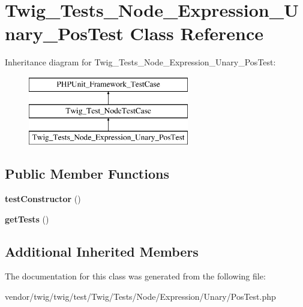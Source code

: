 \hypertarget{classTwig__Tests__Node__Expression__Unary__PosTest}{}\section{Twig\+\_\+\+Tests\+\_\+\+Node\+\_\+\+Expression\+\_\+\+Unary\+\_\+\+Pos\+Test Class Reference}
\label{classTwig__Tests__Node__Expression__Unary__PosTest}
Inheritance diagram for Twig\+\_\+\+Tests\+\_\+\+Node\+\_\+\+Expression\+\_\+\+Unary\+\_\+\+Pos\+Test\+:\begin{figure}[H]
\begin{center}
\leavevmode
\includegraphics[height=3.000000cm]{classTwig__Tests__Node__Expression__Unary__PosTest}
\end{center}
\end{figure}
\subsection*{Public Member Functions}
\begin{DoxyCompactItemize}
\item 
{\bfseries test\+Constructor} ()\hypertarget{classTwig__Tests__Node__Expression__Unary__PosTest_aefce6db0d4433975e4c096f1cfa0f5c2}{}\label{classTwig__Tests__Node__Expression__Unary__PosTest_aefce6db0d4433975e4c096f1cfa0f5c2}

\item 
{\bfseries get\+Tests} ()\hypertarget{classTwig__Tests__Node__Expression__Unary__PosTest_abd40729e92d3b12039d565daad8e1821}{}\label{classTwig__Tests__Node__Expression__Unary__PosTest_abd40729e92d3b12039d565daad8e1821}

\end{DoxyCompactItemize}
\subsection*{Additional Inherited Members}


The documentation for this class was generated from the following file\+:\begin{DoxyCompactItemize}
\item 
vendor/twig/twig/test/\+Twig/\+Tests/\+Node/\+Expression/\+Unary/Pos\+Test.\+php\end{DoxyCompactItemize}
